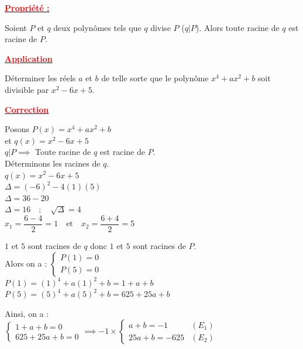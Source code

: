 \documentclass[12pt,a4paper]{article}
\begin{document}
\vspace{1.5em}

\textbf{\underline{\textcolor{red}{Propriété :}}}  

Soient $P$ et $q$ deux polynômes tels que $q$ divise $P$ ($q | P$). Alors toute racine de $q$ est racine de $P$.

\vspace{1em}

\begin{center}
    \textbf{\underline{\textcolor{red}{Application}}}
\end{center}
\noindent Déterminer les réels $a$ et $b$ de telle sorte que le polynôme $x^4 + ax^2 + b$ soit divisible par $x^2 - 6x + 5$.

\begin{center}
    \textbf{\underline{\textcolor{red}{Correction}}}
\end{center}

\noindent Posons $P(x) = x^4 + ax^2 + b$ \\
et $q(x) = x^2 - 6x + 5$ \\
$q | P \implies$ Toute racine de $q$ est racine de $P$. \\
Déterminons les racines de $q$. \\
$q(x) = x^2 - 6x + 5$ \\
$\Delta = (-6)^2 - 4(1)(5)$ \\
$\Delta = 36 - 20$ \\
$\Delta = 16 \quad ; \quad \sqrt{\Delta} = 4$ \\
$x_1 = \dfrac{6 - 4}{2} = 1 \quad \text{et} \quad x_2 = \dfrac{6 + 4}{2} = 5$

\vspace{1em}

\noindent $1$ et $5$ sont racines de $q$ donc $1$ et $5$ sont racines de $P$. \\
Alors on a : $\begin{cases} P(1) = 0 \\ P(5) = 0 \end{cases}$ \\
$P(1) = (1)^4 + a(1)^2 + b = 1 + a + b$ \\
$P(5) = (5)^4 + a(5)^2 + b = 625 + 25a + b$

\vspace{1em}

\noindent Ainsi, on a : \\
$\begin{cases} 1 + a + b = 0 \\ 625 + 25a + b = 0 \end{cases} \implies -1 \times \begin{cases} a + b = -1 & (E_1) \\ 25a + b = -625 & (E_2) \end{cases}$
\end{document}
